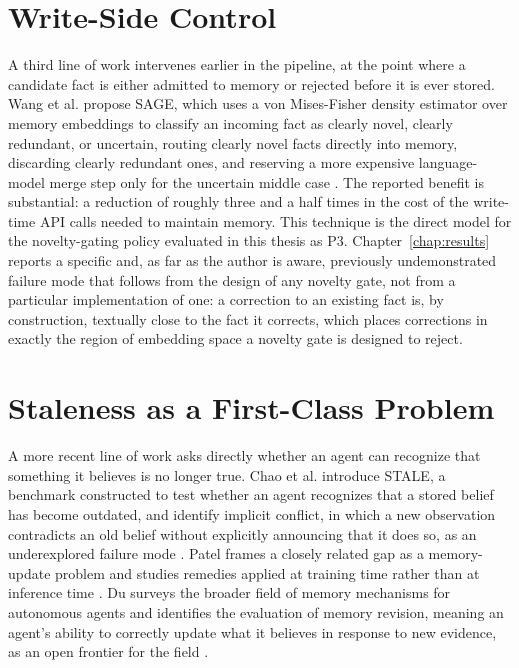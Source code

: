 \section{Write-Side Control}
\label{sec:related-write-side}

A third line of work intervenes earlier in the pipeline, at the point where a candidate fact is either admitted to memory or rejected before it is ever stored. Wang et al. propose SAGE, which uses a von Mises-Fisher density estimator over memory embeddings to classify an incoming fact as clearly novel, clearly redundant, or uncertain, routing clearly novel facts directly into memory, discarding clearly redundant ones, and reserving a more expensive language-model merge step only for the uncertain middle case \citep{wang2026sage}. The reported benefit is substantial: a reduction of roughly three and a half times in the cost of the write-time API calls needed to maintain memory. This technique is the direct model for the novelty-gating policy evaluated in this thesis as P3. Chapter~\ref{chap:results} reports a specific and, as far as the author is aware, previously undemonstrated failure mode that follows from the design of any novelty gate, not from a particular implementation of one: a correction to an existing fact is, by construction, textually close to the fact it corrects, which places corrections in exactly the region of embedding space a novelty gate is designed to reject.

\section{Staleness as a First-Class Problem}
\label{sec:related-staleness}

A more recent line of work asks directly whether an agent can recognize that something it believes is no longer true. Chao et al. introduce STALE, a benchmark constructed to test whether an agent recognizes that a stored belief has become outdated, and identify implicit conflict, in which a new observation contradicts an old belief without explicitly announcing that it does so, as an underexplored failure mode \citep{chao2026stale}. Patel frames a closely related gap as a memory-update problem and studies remedies applied at training time rather than at inference time \citep{patel2026supersede}. Du surveys the broader field of memory mechanisms for autonomous agents and identifies the evaluation of memory revision, meaning an agent's ability to correctly update what it believes in response to new evidence, as an open frontier for the field \citep{du2026memory}.

